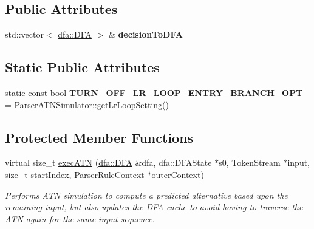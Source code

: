 \subsection*{Public Attributes}
\begin{DoxyCompactItemize}
\item 
\mbox{\label{classantlr4_1_1atn_1_1ParserATNSimulator_a1e32f99f820baf3079b4bb631e5ada4f}} 
std\+::vector$<$ \hyperlink{classantlr4_1_1dfa_1_1DFA}{dfa\+::\+D\+FA} $>$ \& {\bfseries decision\+To\+D\+FA}
\end{DoxyCompactItemize}
\subsection*{Static Public Attributes}
\begin{DoxyCompactItemize}
\item 
\mbox{\label{classantlr4_1_1atn_1_1ParserATNSimulator_a8c639842e974461b22d4b4c314ee4d1d}} 
static const bool {\bfseries T\+U\+R\+N\+\_\+\+O\+F\+F\+\_\+\+L\+R\+\_\+\+L\+O\+O\+P\+\_\+\+E\+N\+T\+R\+Y\+\_\+\+B\+R\+A\+N\+C\+H\+\_\+\+O\+PT} = Parser\+A\+T\+N\+Simulator\+::get\+Lr\+Loop\+Setting()
\end{DoxyCompactItemize}
\subsection*{Protected Member Functions}
\begin{DoxyCompactItemize}
\item 
virtual size\+\_\+t \hyperlink{classantlr4_1_1atn_1_1ParserATNSimulator_ac7fbaf0a637744b43e6709660a5b12f2}{exec\+A\+TN} (\hyperlink{classantlr4_1_1dfa_1_1DFA}{dfa\+::\+D\+FA} \&dfa, dfa\+::\+D\+F\+A\+State $\ast$s0, Token\+Stream $\ast$input, size\+\_\+t start\+Index, \hyperlink{classantlr4_1_1ParserRuleContext}{Parser\+Rule\+Context} $\ast$outer\+Context)
\begin{DoxyCompactList}\small\item\em Performs A\+TN simulation to compute a predicted alternative based upon the remaining input, but also updates the D\+FA cache to avoid having to traverse the A\+TN again for the same input sequence. \end{DoxyCompactList}\end{DoxyCompactItemize}
